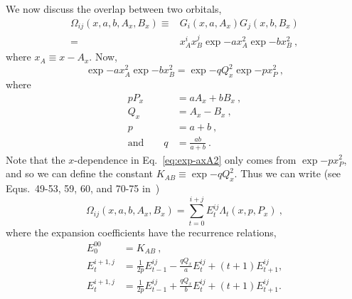 \documentclass[
    prd, twocolumn, superscriptaddress, nofootinbib, amsmath, amssymb,
    aps, floatfix,preprintnumbers
]{revtex4-2}
\begin{document}
    We now discuss the overlap between two orbitals, 
    \begin{equation}
    \begin{split}
        \Omega_{ij}(x, a, b, A_x, B_x) \equiv& G_i(x, a, A_x) G_j (x, b, B_x)\\
        =& x_A^i x_B^j \exp{-ax_A^2}\exp{-bx_B^2}\ ,
    \end{split}
    \end{equation}
    where $x_A\equiv x - A_x$. Now,
    \begin{equation}\label{eq:exp-axA2}
        \exp{-ax_A^2}\exp{-bx_B^2} = \exp{-qQ_x^2}\exp{-px_P^2}\ ,
    \end{equation}
    where
    \begin{equation}
        \begin{split}
            pP_x &= aA_x+bB_x\ ,\\
            Q_x &= A_x - B_x\ ,\\
            p &= a+b\ ,\\
            \text{and}\qquad q &= \frac{ab}{a+b}\ .
        \end{split}
    \end{equation}
    Note that the $x$-dependence in Eq.~\eqref{eq:exp-axA2} only comes from $\exp{-px_P^2}$, and so we can define the constant $K_{AB}\equiv\exp{-qQ_x^2}$. Thus we can write (see Equs.~49-53, 59, 60, and 70-75 in~\cite{GaussianBook})
    \begin{equation}
        \Omega_{ij} (x, a, b, A_x, B_x) = \sum_{t = 0}^{i+j} E_t^{ij} \Lambda_t (x, p, P_x)\ , 
    \end{equation}
    where the expansion coefficients have the recurrence relations,
    \begin{equation}
        \begin{split}
            E_0^{00} &= K_{AB}\ ,\\
            E_t^{i+1, j} &= \frac{1}{2p}E_{t-1}^{ij} - \frac{qQ_x}{a}E^{ij}_t + \left(t+1\right)E_{t+1}^{ij} ,\\
            E_t^{i+1, j} &= \frac{1}{2p}E_{t-1}^{ij} + \frac{qQ_x}{b}E^{ij}_t + \left(t+1\right)E_{t+1}^{ij} .
        \end{split}
    \end{equation}
    
\end{document}
